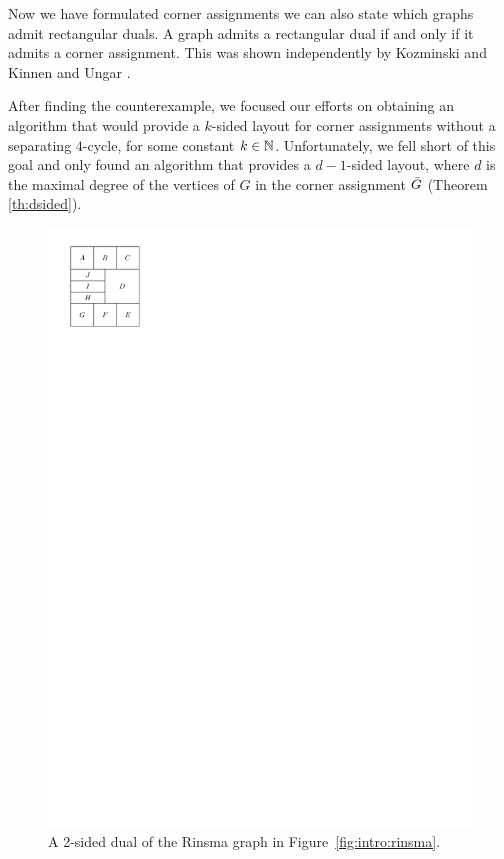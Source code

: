   Now we have formulated corner assignments we can also state which graphs admit rectangular duals.
  A graph admits a rectangular dual if and only if it admits a corner assignment.
  This was shown independently by Kozminski and Kinnen \cite{Kozminski1984} and Ungar \cite{Ungar1953}.

  After finding the counterexample, we focused our efforts on obtaining an algorithm that would provide a $k$-sided layout for corner assignments without a separating $4$-cycle, for some constant $k \in \mathbb{N}$.
  Unfortunately, we fell short of this goal and only found an algorithm that provides a $d-1$-sided layout, where $d$ is the maximal degree of the vertices of $G$ in the corner assignment $\bar{G}$ (Theorem \ref{th:dsided}).

  \begin{figure} %
    \centering
    \includegraphics[]{introduction/img/rinsma2Sided.pdf}
    \caption{A 2-sided dual of the Rinsma graph in Figure~\ref{fig:intro:rinsma}.}
    \label{fig:intro:rinsma2Sided}
  \end{figure}

